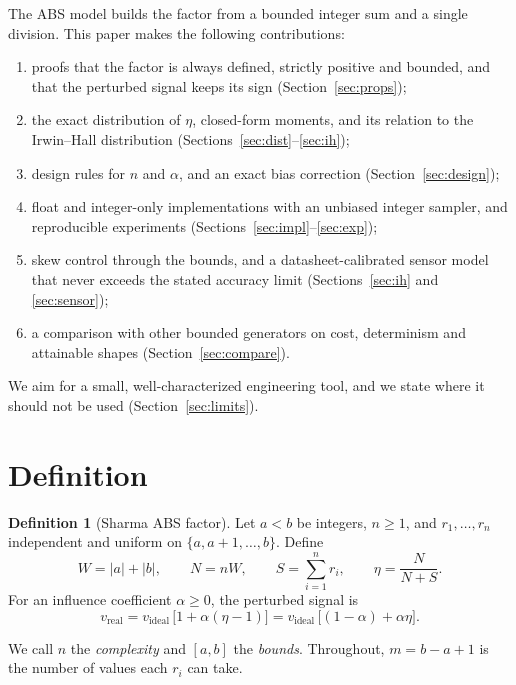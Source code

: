 \documentclass[10pt,a4paper]{article}
\theoremstyle{definition}
\newtheorem{definition}{Definition}
\theoremstyle{remark}
\begin{document}
The ABS model builds the factor from a bounded integer sum and a single division. This
paper makes the following contributions:
\begin{enumerate}
\item proofs that the factor is always defined, strictly positive and bounded, and that the
perturbed signal keeps its sign (Section~\ref{sec:props});
\item the exact distribution of $\eta$, closed-form moments, and its relation to the
Irwin--Hall distribution (Sections~\ref{sec:dist}--\ref{sec:ih});
\item design rules for $n$ and $\alpha$, and an exact bias correction
(Section~\ref{sec:design});
\item float and integer-only implementations with an unbiased integer sampler, and
reproducible experiments (Sections~\ref{sec:impl}--\ref{sec:exp});
\item skew control through the bounds, and a datasheet-calibrated sensor model that never
exceeds the stated accuracy limit (Sections~\ref{sec:ih} and \ref{sec:sensor});
\item a comparison with other bounded generators on cost, determinism and attainable shapes
(Section~\ref{sec:compare}).
\end{enumerate}
We aim for a small, well-characterized engineering tool, and we state where it should not be
used (Section~\ref{sec:limits}).

\section{Definition}
\begin{definition}[Sharma ABS factor]
Let $a<b$ be integers, $n\ge1$, and $r_1,\dots,r_n$ independent and uniform on
$\{a,a+1,\dots,b\}$. Define
\begin{equation}
W = |a|+|b|,\qquad N=nW,\qquad S=\sum_{i=1}^{n} r_i,\qquad
\eta=\frac{N}{N+S}.
\label{eq:eta}
\end{equation}
For an influence coefficient $\alpha\ge0$, the perturbed signal is
\begin{equation}
v_{\text{real}} = v_{\text{ideal}}\,\bigl[1+\alpha(\eta-1)\bigr]
= v_{\text{ideal}}\,\bigl[(1-\alpha)+\alpha\eta\bigr].
\label{eq:apply}
\end{equation}
\end{definition}
We call $n$ the \emph{complexity} and $[a,b]$ the \emph{bounds}. Throughout, $m=b-a+1$ is
the number of values each $r_i$ can take.
\end{document}
